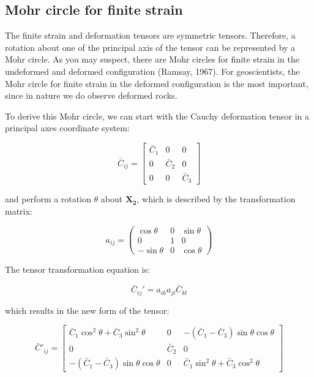 \documentclass[a4paper , 12pt]{book}
\begin{document}
\subsection{Mohr circle for finite strain}

The finite strain and deformation tensors are symmetric tensors. Therefore, a rotation about one of the principal axis of the tensor can be represented by a Mohr circle. As you may suspect, there are Mohr circles for finite strain in the undeformed and deformed configuration (Ramsay, 1967). For geoscientists, the Mohr circle for finite strain in the deformed configuration is the most important, since in nature we do observe deformed rocks. 

To derive this Mohr circle, we can start with the Cauchy deformation tensor in a principal axes coordinate system:

\begin{equation*}
    \bar{C}_{i j}=\left[\begin{array}{ccc}\bar{C}_{1} & 0 & 0 \\ 0 & \bar{C}_{2} & 0 \\ 0 & 0 & \bar{C}_{3}\end{array}\right]
\end{equation*}

and perform a rotation $\theta$ about $\mathbf{X_2}$, which is described by the transformation matrix:

\begin{equation*}
    a_{ij} = \begin{pmatrix}\cos\theta&0&\sin\theta\\0&1&0\\-\sin\theta&0&\cos\theta\end{pmatrix}
\end{equation*}

The tensor transformation equation is:

\begin{equation}
    \bar{C}_{ij}' = a_{ik}a_{jl}\bar{C}_{kl}
\end{equation}

which results in the new form of the tensor:

\begin{equation}
    \bar{C}'_{ij}=\begin{bmatrix}\bar{C}_1\cos^2\theta+\bar{C}_3\sin^2\theta&0&-(\bar{C}_1-\bar{C}_3)\sin\theta\cos\theta\\0&\bar{C}_2&0\\-(\bar{C}_1-\bar{C}_3)\sin\theta\cos\theta&0&\bar{C}_1\sin^2\theta+\bar{C}_3\cos^2\theta\end{bmatrix}
\end{equation}
\end{document}

